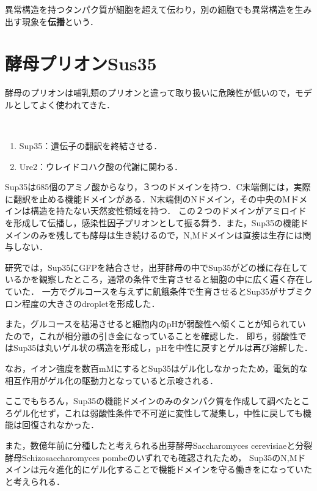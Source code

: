 \documentclass[uplatex, dvipdfmx]{jsreport}
\begin{document}
\begin{definition}[propagation]
    異常構造を持つタンパク質が細胞を超えて伝わり，別の細胞でも異常構造を生み出す現象を\textbf{伝播}という．
\end{definition}

\section{酵母プリオンSus35}

酵母のプリオンは哺乳類のプリオンと違って取り扱いに危険性が低いので，モデルとしてよく使われてきた．

\begin{definition}[酵母プリオン]\mbox{}\\
    \begin{enumerate}
        \item Sup35：遺伝子の翻訳を終結させる．
        \item Ure2：ウレイドコハク酸の代謝に関わる．
    \end{enumerate}
    Sup35は685個のアミノ酸からなり，３つのドメインを持つ．C末端側には，実際に翻訳を止める機能ドメインがある．N末端側のNドメイン，その中央のMドメインは構造を持たない天然変性領域を持つ．
    この２つのドメインがアミロイドを形成して伝播し，感染性因子プリオンとして振る舞う．また，Sup35の機能ドメインのみを残しても酵母は生き続けるので，N,Mドメインは直接は生存には関与しない．
\end{definition}

\begin{research}
    研究\cite{Yeast Prion}では，Sup35にGFPを結合させ，出芽酵母の中でSup35がどの様に存在しているかを観察したところ，通常の条件で生育させると細胞の中に広く遍く存在していた．
    一方でグルコースを与えずに飢餓条件で生育させるとSup35がサブミクロン程度の大きさのdropletを形成した．

    また，グルコースを枯渇させると細胞内のpHが弱酸性へ傾くことが知られていたので，これが相分離の引き金になっていることを確認した．
    即ち，弱酸性ではSup35は丸いゲル状の構造を形成し，pHを中性に戻すとゲルは再び溶解した．

    なお，イオン強度を数百mMにするとSup35はゲル化しなかったため，電気的な相互作用がゲル化の駆動力となっていると示唆される．

    ここでもちろん，Sup35の機能ドメインのみのタンパク質を作成して調べたところゲル化せず，これは弱酸性条件で不可逆に変性して凝集し，中性に戻しても機能は回復されなかった．

    また，数億年前に分種したと考えられる出芽酵母Saccharomyces cerevisiaeと分裂酵母Schizosaccharomyces pombeのいずれでも確認されたため，
    Sup35のN,Mドメインは元々進化的にゲル化することで機能ドメインを守る働きをになっていたと考えられる．
\end{research}
\end{document}
